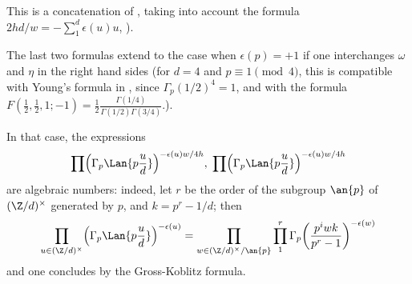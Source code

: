 \noindent This is a concatenation of \cite[3.15, 3.9]{ogus90:_chowl_selber},
taking into account the formula $2hd/w=- \sum_1^d \epsilon(u) u$,
\cf \cite[VII]{vudtdaz}).

\medskip{} The last two formulas extend to the case when
$\epsilon (p)=+1$ if one interchanges $\omega$ and $\eta$ in the right
hand sides (for $d=4$ and $p\equiv 1\pmod{4}$, this
is compatible with Young's formula in , since
$\Gamma_p(1/2)^4=1$, and with the formula
$F(\frac{1}{2},\frac{1}{2},1;-1)=\frac{1}{2}
\frac{\Gamma(1/4)}{\Gamma(1/2)\Gamma(3/4)}$.). 

 In that case, the expressions 
 \begin{equation*}
  \prod\Bigl(\Gamma_p\Lan{p\frac{u}{d}}\Bigr)^{-\epsilon(u)w/4h},\;
   \prod\Bigl(\Gamma_p\Lan{p\frac{u}{d}}\Bigr)^{-\epsilon(u)w/4h}
 \end{equation*}
 are algebraic numbers: indeed, let $r$ be the order of the subgroup
 $\an{p}$ of $({\Z}/d)^{\times}$ 
 generated by $p$, and $k= p^r-1/d$; then
\begin{equation*}
 \prod_{u\in
  ({\Z}/d)^{\times}}\Bigl(\Gamma_p\Lan{p\frac{u}{d}}\Bigr)^{-\epsilon(u)}=
  \prod_{w\in ({\Z}/d)^{\times}/\an{p}}\prod_1^{r}
  \Gamma_p\biggl(\frac{p^i wk}{p^r-1}\biggr)^{-\epsilon(w)}
\end{equation*}
and one concludes by the Gross-Koblitz formula.  
 
